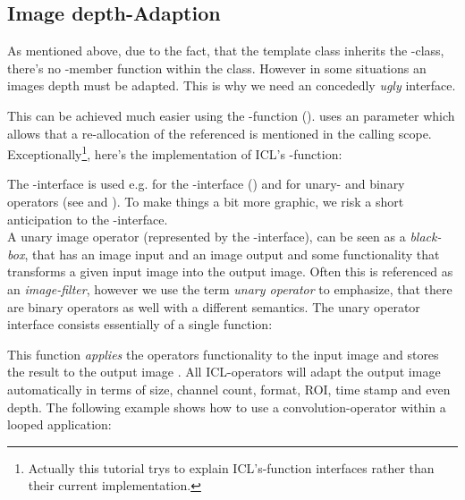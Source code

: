 \subsection {\label{subsec:depth-adaption}Image depth-Adaption}

As mentioned above, due to the fact, that the  template class inherits the -class, there's no -member function within the  class. However in some situations an images depth must be adapted. This is why we need an concededly \emph{ugly}  interface.


This can be achieved much easier using the -function (). 
 uses an  parameter which allows that a re-allocation of the referenced  is mentioned in the calling scope. Exceptionally\footnote{Actually this tutorial trys to explain ICL's-function interfaces rather than their current implementation.}, here's the implementation of ICL's -function:


The -interface is used e.g. for the -interface () and for unary- and binary operators (see  and ). To make things a bit more graphic, we risk a short anticipation to the -interface.\\
A unary image operator (represented by the -interface), can be seen as a \emph{black-box}, that has an image input and an image output and some functionality that transforms a given input image into the output image. Often this is referenced as an \emph{image-filter}, however we use the term \emph{unary operator} to emphasize, that there are binary operators as well with a different semantics. The unary operator interface consists essentially of a single function:


This function \emph{applies} the operators functionality to the input image  and stores the result to the output image . All ICL-operators will adapt the output image automatically in terms of size, channel count, format, ROI, time stamp and even depth. The following example shows how to use a convolution-operator within a looped application:

